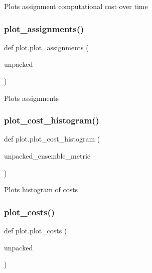 \begin{DoxyVerb}Plots assignment computational cost over time
\end{DoxyVerb}
 \mbox{\label{namespaceplot_adbe4a880d658eef510387e828d07beb7}} 
\subsubsection{\texorpdfstring{plot\_assignments()}{plot\_assignments()}}
{\footnotesize\ttfamily def plot.\+plot\+\_\+assignments (\begin{DoxyParamCaption}\item[{}]{unpacked }\end{DoxyParamCaption})}

\begin{DoxyVerb}Plots assignments
\end{DoxyVerb}
 \mbox{\label{namespaceplot_a68b5e0433f49ae13ceb7df2cc74b9911}} 
\subsubsection{\texorpdfstring{plot\_cost\_histogram()}{plot\_cost\_histogram()}}
{\footnotesize\ttfamily def plot.\+plot\+\_\+cost\+\_\+histogram (\begin{DoxyParamCaption}\item[{}]{unpacked\+\_\+ensemble\+\_\+metric }\end{DoxyParamCaption})}

\begin{DoxyVerb}Plots histogram of costs
\end{DoxyVerb}
 \mbox{\label{namespaceplot_a5f23bc00f5f8588e6c3de940ff5a0b28}} 
\subsubsection{\texorpdfstring{plot\_costs()}{plot\_costs()}}
{\footnotesize\ttfamily def plot.\+plot\+\_\+costs (\begin{DoxyParamCaption}\item[{}]{unpacked }\end{DoxyParamCaption})}

